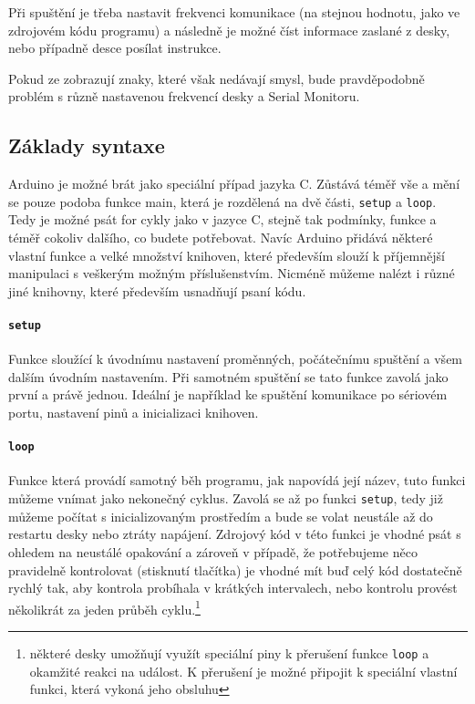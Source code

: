 \documentclass[12pt,titlepage]{article}
\begin{document}
			Při spuštění je třeba nastavit frekvenci komunikace (na stejnou hodnotu, jako ve zdrojovém kódu programu) a následně je možné číst informace zaslané z desky, nebo případně desce posílat instrukce. 
			
			Pokud ze zobrazují znaky, které však nedávají smysl, bude pravděpodobně problém s různě nastavenou frekvencí desky a Serial Monitoru. 
		
		
	\subsection{Základy syntaxe}
			Arduino je možné brát jako speciální případ jazyka C. Zůstává téměř vše a mění se pouze podoba funkce main, která je rozdělená na dvě části, \texttt{setup} a \texttt{loop}. 
			Tedy je možné psát for cykly jako v jazyce C, stejně tak podmínky, funkce a téměř cokoliv dalšího, co budete potřebovat. Navíc Arduino přidává některé vlastní funkce a velké množství knihoven, které především slouží k příjemnější manipulaci s veškerým možným příslušenstvím. Nicméně můžeme nalézt i různé jiné knihovny, které především usnadňují psaní kódu. 
			
		\paragraph{\textbf{\texttt{setup}}}
			Funkce sloužící k úvodnímu nastavení proměnných, počátečnímu spuštění a všem dalším úvodním nastavením. Při samotném spuštění se tato funkce zavolá jako první a právě jednou. Ideální je například ke spuštění komunikace po sériovém portu, nastavení pinů a inicializaci knihoven.
		
		\paragraph{\textbf{\texttt{loop}}}
			Funkce která provádí samotný běh programu, jak napovídá její název, tuto funkci můžeme vnímat jako nekonečný cyklus. Zavolá se až po funkci \texttt{setup}, tedy již můžeme počítat s inicializovaným prostředím a bude se volat neustále až do restartu desky nebo ztráty napájení. Zdrojový kód v této funkci je vhodné psát s ohledem na neustálé opakování a zároveň v případě, že potřebujeme něco pravidelně kontrolovat (stisknutí tlačítka) je vhodné mít buď celý kód dostatečně rychlý tak, aby kontrola probíhala v krátkých intervalech, nebo kontrolu provést několikrát za jeden průběh cyklu.\footnote{některé desky umožňují využít speciální piny k přerušení funkce \texttt{loop} a okamžité reakci na událost. K přerušení je možné připojit k speciální vlastní funkci, která vykoná jeho obsluhu}
			
\end{document}
